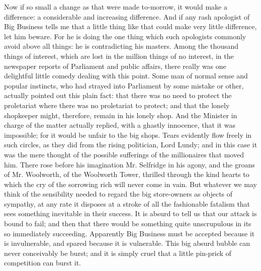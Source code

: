 \documentclass{book}
\begin{document}
Now if so small a change as that were made to-morrow, it would make a difference: a considerable and increasing difference. And if any rash apologist of Big Business tells me that a little thing like that could make very little difference, let him beware. For he is doing the one thing which such apologists commonly avoid above all things: he is contradicting his masters. Among the thousand things of interest, which are lost in the million things of no interest, in the newspaper reports of Parliament and public affairs, there really was one delightful little comedy dealing with this point. Some man of normal sense and popular instincts, who had strayed into Parliament by some mistake or other, actually pointed out this plain fact: that there was no need to protect the proletariat where there was no proletariat to protect; and that the lonely shopkeeper might, therefore, remain in his lonely shop. And the Minister in charge of the matter actually replied, with a ghastly innocence, that it was impossible; for it would be unfair to the big shops. Tears evidently flow freely in such circles, as they did from the rising politician, Lord Lundy; and in this case it was the mere thought of the possible sufferings of the millionaires that moved him. There rose before his imagination Mr. Selfridge in his agony, and the groans of Mr. Woolworth, of the Woolworth Tower, thrilled through the kind hearts to which the cry of the sorrowing rich will never come in vain. But whatever we may think of the sensibility needed to regard the big store-owners as objects of sympathy, at any rate it disposes at a stroke of all the fashionable fatalism that sees something inevitable in their success. It is absurd to tell us that our attack is bound to fail; and then that there would be something quite unscrupulous in its so immediately succeeding. Apparently Big Business must be accepted because it is invulnerable, and spared because it is vulnerable. This big absurd bubble can never conceivably be burst; and it is simply cruel that a little pin-prick of competition can burst it.
\end{document}
